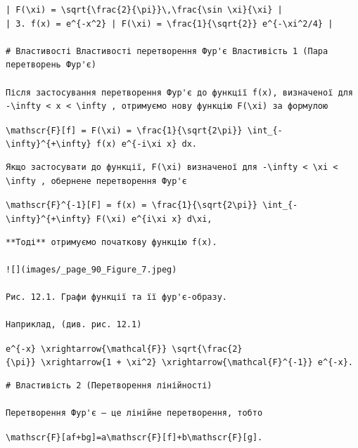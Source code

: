 \documentclass[
  ukrainian,
]{article}
\begin{document}
\begin{verbatim}
| F(\xi) = \sqrt{\frac{2}{\pi}}\,\frac{\sin \xi}{\xi} |
| 3. f(x) = e^{-x^2} | F(\xi) = \frac{1}{\sqrt{2}} e^{-\xi^2/4} |

# Властивості Властивості перетворення Фур'є Властивість 1 (Пара перетворень Фур'є)

Після застосування перетворення Фур'є до функції f(x), визначеної для -\infty < x < \infty , отримуємо нову функцію F(\xi) за формулою
\end{verbatim}

\texttt{\textbackslash{}mathscr\{F\}{[}f{]}\ =\ F(\textbackslash{}xi)\ =\ \textbackslash{}frac\{1\}\{\textbackslash{}sqrt\{2\textbackslash{}pi\}\}\ \textbackslash{}int\_\{-\textbackslash{}infty\}\^{}\{+\textbackslash{}infty\}\ f(x)\ e\^{}\{-i\textbackslash{}xi\ x\}\ dx.}

\begin{verbatim}
Якщо застосувати до функції, F(\xi) визначеної для -\infty < \xi < \infty , обернене перетворення Фур'є
\end{verbatim}

\texttt{\textbackslash{}mathscr\{F\}\^{}\{-1\}{[}F{]}\ =\ f(x)\ =\ \textbackslash{}frac\{1\}\{\textbackslash{}sqrt\{2\textbackslash{}pi\}\}\ \textbackslash{}int\_\{-\textbackslash{}infty\}\^{}\{+\textbackslash{}infty\}\ F(\textbackslash{}xi)\ e\^{}\{i\textbackslash{}xi\ x\}\ d\textbackslash{}xi,}

\begin{verbatim}
**Тоді** отримуємо початкову функцію f(x).

![](images/_page_90_Figure_7.jpeg)

Рис. 12.1. Графи функції та її фур'є-образу.

Наприклад, (див. рис. 12.1)
\end{verbatim}

\texttt{e\^{}\{-\textbar{}x\textbar{}\}\ \textbackslash{}xrightarrow\{\textbackslash{}mathcal\{F\}\}\ \textbackslash{}sqrt\{\textbackslash{}frac\{2\}\{\textbackslash{}pi\}\}\ \textbackslash{}xrightarrow\{1\ +\ \textbackslash{}xi\^{}2\}\ \textbackslash{}xrightarrow\{\textbackslash{}mathcal\{F\}\^{}\{-1\}\}\ e\^{}\{-\textbar{}x\textbar{}\}.}

\begin{verbatim}
# Властивість 2 (Перетворення лінійності)

Перетворення Фур'є — це лінійне перетворення, тобто
\end{verbatim}

\texttt{\textbackslash{}mathscr\{F\}{[}af+bg{]}=a\textbackslash{}mathscr\{F\}{[}f{]}+b\textbackslash{}mathscr\{F\}{[}g{]}.}
\end{document}
